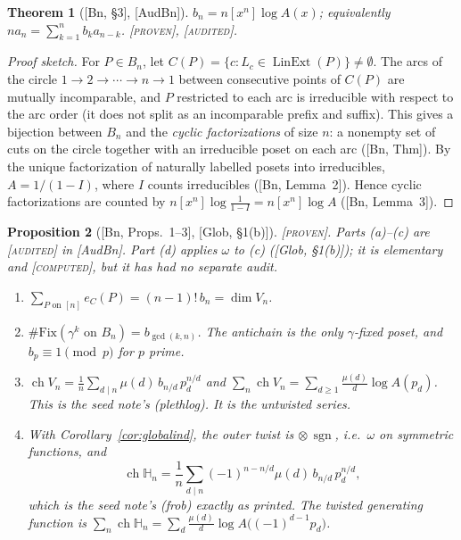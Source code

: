 \documentclass[11pt]{article}
\newtheorem{theorem}{Theorem}[section]
\newtheorem{proposition}[theorem]{Proposition}
\theoremstyle{definition}
\theoremstyle{remark}
\newcommand{\Lin}{\operatorname{LinExt}}
\newcommand{\sgn}{\operatorname{sgn}}
\newcommand{\ch}{\operatorname{ch}}
\newcommand{\HH}{\mathbb H}
\newcommand{\st}[1]{\textup{[\textsc{#1}]}}
\begin{document}
\begin{theorem}[{[Bn, \S3]}, {[AudBn]}]\label{thm:bn}
$b_n=n[x^n]\log A(x)$; equivalently $na_n=\sum_{k=1}^nb_ka_{n-k}$.
\st{proven}, \st{audited}.
\end{theorem}

\begin{proof}[Proof sketch]
For $P\in B_n$, let $C(P)=\{c:L_c\in\Lin(P)\}\ne\emptyset$. The arcs of the
circle $1\to2\to\cdots\to n\to1$ between consecutive points of $C(P)$ are
mutually incomparable, and $P$ restricted to each arc is irreducible with
respect to the arc order (it does not split as an incomparable prefix and
suffix). This gives a bijection between $B_n$ and the \emph{cyclic
factorizations} of size $n$: a nonempty set of cuts on the circle together
with an irreducible poset on each arc ([Bn, Thm]). By the unique
factorization of naturally labelled posets into irreducibles,
$A=1/(1-I)$, where $I$ counts irreducibles ([Bn, Lemma~2]). Hence cyclic
factorizations are counted by $n[x^n]\log\frac1{1-I}=n[x^n]\log A$
([Bn, Lemma~3]).
\end{proof}

\begin{proposition}[{[Bn, Props.~1--3]}, {[Glob, \S1(b)]}]\label{prop:frob}
\st{proven}. Parts (a)--(c) are \st{audited} in [AudBn]. Part (d) applies
$\omega$ to (c) ([Glob, \S1(b)]); it is elementary and \st{computed}, but it
has had no separate audit.
\begin{enumerate}[label=(\alph*)]
\item $\sum_{P\text{ on }[n]}e_C(P)=(n-1)!\,b_n=\dim V_n$.
\item $\#\mathrm{Fix}(\gamma^k\text{ on }B_n)=b_{\gcd(k,n)}$. The antichain
  is the only $\gamma$-fixed poset, and $b_p\equiv1\pmod p$ for $p$ prime.
\item $\ch V_n=\frac1n\sum_{d\mid n}\mu(d)\,b_{n/d}\,p_d^{n/d}$ and
  $\sum_n\ch V_n=\sum_{d\ge1}\frac{\mu(d)}d\log A(p_d)$. This is the seed
  note's (plethlog). It is the \emph{untwisted} series.
\item With Corollary~\ref{cor:globalind}, the outer twist is
  $\otimes\,\sgn$, i.e.\ $\omega$ on symmetric functions, and
  \[
  \ch\HH_n=\frac1n\sum_{d\mid n}(-1)^{n-n/d}\mu(d)\,b_{n/d}\,p_d^{n/d},
  \]
  which is the seed note's (frob) exactly as printed. The twisted generating
  function is
  $\sum_n\ch\HH_n=\sum_d\frac{\mu(d)}d\log A\bigl((-1)^{d-1}p_d\bigr)$.
\end{enumerate}
\end{proposition}
\end{document}
